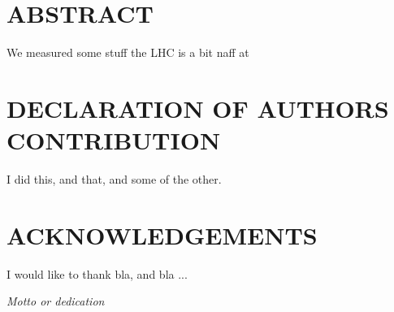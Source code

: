 \chapter*{ABSTRACT}
%
We measured some stuff the LHC is a bit naff at
%
\clearpage
\chapter*{DECLARATION OF AUTHORS CONTRIBUTION}
%
I did this, and that, and some of the other.
%
\clearpage
\chapter*{ACKNOWLEDGEMENTS}
%
I would like to thank bla, and bla ...
%
\cleardoublepage
~
\vspace*{\fill}
\begin{center}
  \emph{Motto or dedication}
\end{center}
\vspace*{\fill}
\cleardoublepage
